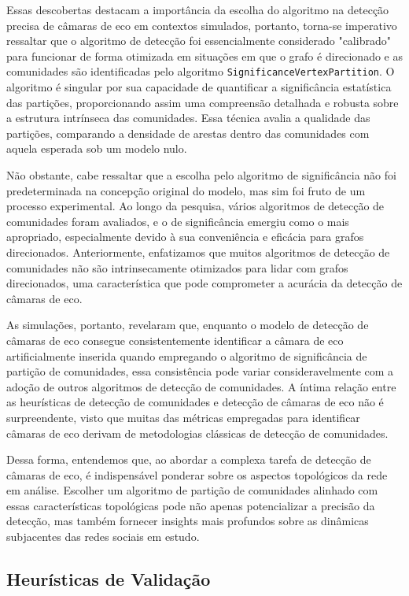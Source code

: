 Essas descobertas destacam a importância da escolha do algoritmo na detecção precisa de câmaras de eco em contextos simulados, portanto, torna-se imperativo ressaltar que o algoritmo de detecção foi essencialmente considerado "calibrado" para funcionar de forma otimizada em situações em que o grafo é direcionado e as comunidades são identificadas pelo algoritmo \texttt{SignificanceVertexPartition}. O algoritmo é singular por sua capacidade de quantificar a significância estatística das partições, proporcionando assim uma compreensão detalhada e robusta sobre a estrutura intrínseca das comunidades. Essa técnica avalia a qualidade das partições, comparando a densidade de arestas dentro das comunidades com aquela esperada sob um modelo nulo.

Não obstante, cabe ressaltar que a escolha pelo algoritmo de significância não foi predeterminada na concepção original do modelo, mas sim foi fruto de um processo experimental. Ao longo da pesquisa, vários algoritmos de detecção de comunidades foram avaliados, e o de significância emergiu como o mais apropriado, especialmente devido à sua conveniência e eficácia para grafos direcionados. Anteriormente, enfatizamos que muitos algoritmos de detecção de comunidades não são intrinsecamente otimizados para lidar com grafos direcionados, uma característica que pode comprometer a acurácia da detecção de câmaras de eco.

As simulações, portanto, revelaram que, enquanto o modelo de detecção de câmaras de eco consegue consistentemente identificar a câmara de eco artificialmente inserida quando empregando o algoritmo de significância de partição de comunidades, essa consistência pode variar consideravelmente com a adoção de outros algoritmos de detecção de comunidades. A íntima relação entre as heurísticas de detecção de comunidades e detecção de câmaras de eco não é surpreendente, visto que muitas das métricas empregadas para identificar câmaras de eco derivam de metodologias clássicas de detecção de comunidades.

Dessa forma, entendemos que, ao abordar a complexa tarefa de detecção de câmaras de eco, é indispensável ponderar sobre os aspectos topológicos da rede em análise. Escolher um algoritmo de partição de comunidades alinhado com essas características topológicas pode não apenas potencializar a precisão da detecção, mas também fornecer insights mais profundos sobre as dinâmicas subjacentes das redes sociais em estudo.

\subsection{Heurísticas de Validação}


